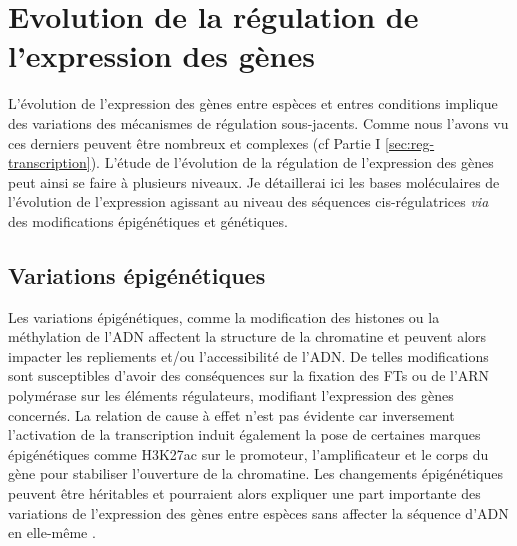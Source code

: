 \section{Evolution de la régulation de l’expression des gènes}
\label{sec:evol-regul}

L’évolution de l’expression des gènes entre espèces et entres \glspl{condition} implique des variations des mécanismes de régulation sous-jacents. Comme nous l’avons vu ces derniers peuvent être nombreux et complexes (cf Partie I \ref{sec:reg-transcription}). L’étude de l’évolution de la régulation de l’expression des gènes peut ainsi se faire à plusieurs niveaux. Je détaillerai ici les bases moléculaires de l’évolution de l’expression agissant au niveau des séquences \gls{cis}-régulatrices \textit{via} des modifications épigénétiques et génétiques.

\subsection{Variations épigénétiques}
\label{subsec:variation-epigenet}

Les variations épigénétiques, comme la modification des histones ou la méthylation de l’ADN affectent la structure de la chromatine et peuvent alors impacter les repliements et/ou l’accessibilité de l’ADN. De telles modifications sont susceptibles d’avoir des conséquences sur la fixation des \acrshort{FT}s ou de l'ARN polymérase sur les éléments régulateurs, modifiant l’expression des gènes concernés. La relation de cause à effet n’est pas évidente car inversement l’activation de la transcription induit également la pose de certaines marques épigénétiques comme H3K27ac sur le promoteur, l’\gls{amplificateur} et le corps du gène pour stabiliser l’ouverture de la chromatine. Les changements épigénétiques peuvent être héritables et pourraient alors expliquer une part importante des variations de l’expression des gènes entre espèces sans affecter la séquence d’ADN en elle-même \citep{lind_evolutionary_2018}. \\

